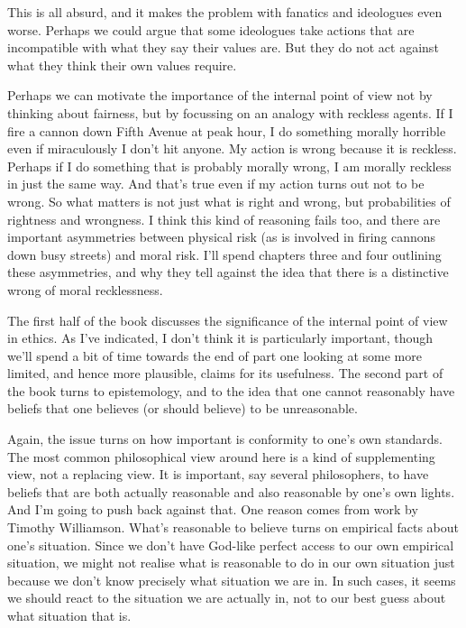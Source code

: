 This is all absurd, and it makes the problem with fanatics and ideologues even worse. Perhaps we could argue that some ideologues take actions that are incompatible with what they say their values are. But they do not act against what they think their own values require.

Perhaps we can motivate the importance of the internal point of view not by thinking about fairness, but by focussing on an analogy with reckless agents. If I fire a cannon down Fifth Avenue at peak hour, I do something morally horrible even if miraculously I don't hit anyone. My action is wrong because it is reckless. Perhaps if I do something that is probably morally wrong, I am morally reckless in just the same way. And that's true even if my action turns out not to be wrong. So what matters is not just what is right and wrong, but probabilities of rightness and wrongness. I think this kind of reasoning fails too, and there are important asymmetries between physical risk (as is involved in firing cannons down busy streets) and moral risk. I'll spend chapters three and four outlining these asymmetries, and why they tell against the idea that there is a distinctive wrong of moral recklessness.

The first half of the book discusses the significance of the internal point of view in ethics. As I've indicated, I don't think it is particularly important, though we'll spend a bit of time towards the end of part one looking at some more limited, and hence more plausible, claims for its usefulness. The second part of the book turns to epistemology, and to the idea that one cannot reasonably have beliefs that one believes (or should believe) to be unreasonable.

Again, the issue turns on how important is conformity to one's own standards. The most common philosophical view around here is a kind of supplementing view, not a replacing view. It is important, say several philosophers, to have beliefs that are both actually reasonable and also reasonable by one's own lights. And I'm going to push back against that. One reason comes from work by Timothy Williamson. What's reasonable to believe turns on empirical facts about one's situation. Since we don't have God-like perfect access to our own empirical situation, we might not realise what is reasonable to do in our own situation just because we don't know precisely what situation we are in. In such cases, it seems we should react to the situation we are actually in, not to our best guess about what situation that is.

